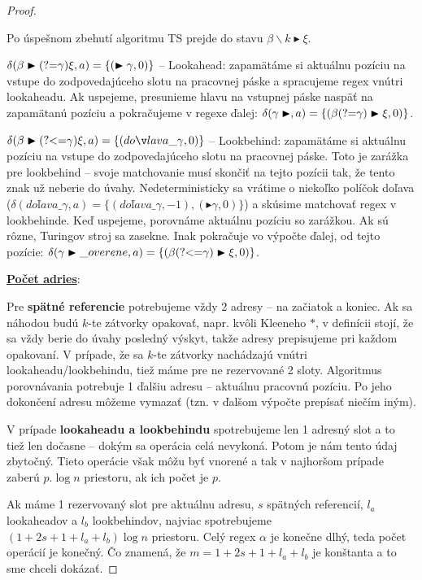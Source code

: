 \begin{proof}
\begin{list}{}{}
Po úspešnom zbehutí algoritmu TS prejde do stavu $\beta\backslash k \blacktriangleright\xi$.
\item $\delta(\beta\blacktriangleright\text{(?=}\gamma)\xi, a) = \lbrace (\blacktriangleright\gamma, 0) \rbrace$ -- Lookahead: zapamätáme si aktuálnu pozíciu na vstupe do zodpovedajúceho slotu na pracovnej páske a spracujeme regex vnútri lookaheadu. Ak uspejeme, presunieme hlavu na vstupnej páske naspäť na zapamätanú pozíciu a pokračujeme v regexe ďalej: $\delta(\gamma\blacktriangleright, a) = \lbrace (\beta\text{(?=}\gamma)\blacktriangleright\xi, 0) \rbrace $.
\item $\delta(\beta\blacktriangleright\lookbehind\gamma)\xi, a) = \lbrace (doľava\_ \gamma, 0) \rbrace$
-- Lookbehind: zapamätáme si aktuálnu pozíciu na vstupe do zodpovedajúceho slotu na pracovnej páske. Toto je zarážka pre lookbehind -- svoje matchovanie musí skončiť na tejto pozícii tak, že tento znak už neberie do úvahy. Nedeterministicky sa vrátime o niekoľko políčok doľava ($\delta(doľava\_ \gamma, a) = \lbrace(doľava\_ \gamma,-1), (\blacktriangleright\gamma, 0)\rbrace$)  a skúsime matchovať regex v lookbehinde. Keď uspejeme, porovnáme aktuálnu pozíciu so zarážkou. Ak sú rôzne, Turingov stroj sa zasekne. Inak pokračuje vo výpočte ďalej, od tejto pozície: $\delta(\gamma\blacktriangleright\_overene, a) = \lbrace (\beta\text{(?\textless =} \gamma)\blacktriangleright\xi, 0) \rbrace $.
\end{list}

\textbf{\underline{Počet adries}}:

Pre \textbf{spätné referencie} potrebujeme vždy 2 adresy -- na začiatok a koniec. Ak sa náhodou budú $k$-te zátvorky opakovať, napr. kvôli Kleeneho $*$, v definícii stojí, že sa vždy berie do úvahy posledný výskyt, takže adresy prepisujeme pri každom opakovaní. V prípade, že sa $k$-te zátvorky nachádzajú vnútri lookaheadu/lookbehindu, tiež máme pre ne rezervované 2 sloty. Algoritmus porovnávania potrebuje 1 ďalšiu adresu -- aktuálnu pracovnú pozíciu. Po jeho dokončení adresu môžeme vymazať (tzn. v ďalšom výpočte prepísať niečím iným).

V prípade \textbf{lookaheadu a lookbehindu} spotrebujeme len 1 adresný slot a to tiež len dočasne -- dokým sa operácia celá nevykoná. Potom je nám tento údaj zbytočný. Tieto operácie však môžu byť vnorené a tak v najhoršom prípade zaberú $p.\log n$ priestoru, ak ich počet je $p$.

Ak máme 1 rezervovaný slot pre aktuálnu adresu, $s$ spätných referencií, $l_a$ lookaheadov a $l_b$ lookbehindov, najviac spotrebujeme $(1+2s+1+l_a+l_b)\log n$ priestoru. Celý regex $\alpha$ je konečne dlhý, teda počet operácií je konečný. Čo znamená, že $m=1+2s+1+l_a+l_b$ je konštanta a to sme chceli dokázať.

\end{proof}



